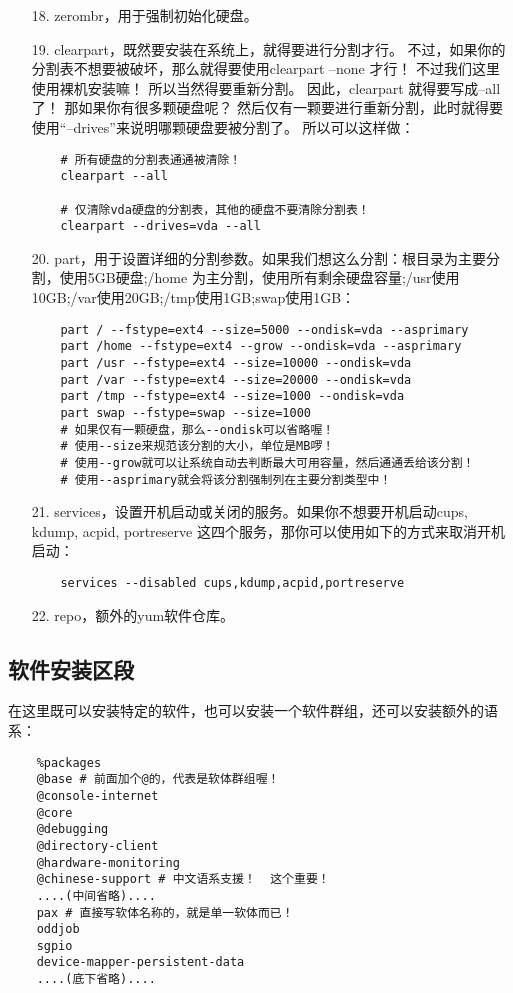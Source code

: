 \documentclass[a4paper,left=1.5cm,right=1.5cm,11pt]{article}
\begin{document}
\begin{itemize}
		\item[18.] zerombr，用于强制初始化硬盘。
		\item[19.] clearpart，既然要安装在系统上，就得要进行分割才行。 
		不过，如果你的分割表不想要被破坏，那么就得要使用clearpart --none 才行！ 
		不过我们这里使用裸机安装嘛！ 所以当然得要重新分割。 
		因此，clearpart 就得要写成--all 了！ 
		那如果你有很多颗硬盘呢？ 然后仅有一颗要进行重新分割，此时就得要使用“--drives”来说明哪颗硬盘要被分割了。 
		所以可以这样做：
		\begin{lstlisting}
	# 所有硬盘的分割表通通被清除！
	clearpart --all 

	# 仅清除vda硬盘的分割表，其他的硬盘不要清除分割表！ 
	clearpart --drives=vda --all
		\end{lstlisting}

		\item[20.] part，用于设置详细的分割参数。如果我们想这么分割：根目录为主要分割，使用5GB硬盘;/home 为主分割，使用所有剩余硬盘容量;/usr使用10GB;/var使用20GB;/tmp使用1GB;swap使用1GB：
		\begin{lstlisting}
	part / --fstype=ext4 --size=5000 --ondisk=vda --asprimary 
	part /home --fstype=ext4 --grow --ondisk=vda --asprimary 
	part /usr --fstype=ext4 --size=10000 --ondisk=vda 
	part /var --fstype=ext4 --size=20000 --ondisk=vda 
	part /tmp --fstype=ext4 --size=1000 --ondisk=vda 
	part swap --fstype=swap --size=1000
	# 如果仅有一颗硬盘，那么--ondisk可以省略喔！ 
	# 使用--size来规范该分割的大小，单位是MB啰！ 
	# 使用--grow就可以让系统自动去判断最大可用容量，然后通通丢给该分割！ 
	# 使用--asprimary就会将该分割强制列在主要分割类型中！
		\end{lstlisting}

		\item[21.] services，设置开机启动或关闭的服务。如果你不想要开机启动cups, kdump, acpid, portreserve 这四个服务，那你可以使用如下的方式来取消开机启动：
		\begin{lstlisting}
 	services --disabled cups,kdump,acpid,portreserve
		\end{lstlisting}

		\item[22.] repo，额外的yum软件仓库。
	\end{itemize}

\subsection{软件安装区段}
	在这里既可以安装特定的软件，也可以安装一个软件群组，还可以安装额外的语系：
	\begin{lstlisting}
	%packages
	@base # 前面加个@的，代表是软体群组喔！
	@console-internet
	@core
	@debugging
	@directory-client
	@hardware-monitoring
	@chinese-support # 中文语系支援！  这个重要！
	....(中间省略)....
	pax # 直接写软体名称的，就是单一软体而已！
	oddjob
	sgpio
	device-mapper-persistent-data
	....(底下省略)....
	\end{lstlisting}
\end{document}
